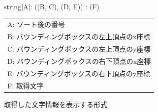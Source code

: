 \begin{figure}[tp]
    \begin{center}
        string[A]: ((B, C), (D, E)) : (F)
    \end{center}

    \begin{center}
        \begin{tabular}{l}
        A: ソート後の番号\\  
        B: バウンディングボックスの左上頂点のx座標\\
        C: バウンディングボックスの左上頂点のy座標\\  
        D: バウンディングボックスの右下頂点のx座標\\
        E: バウンディングボックスの右下頂点のy座標\\
        F: 取得文字\\
        \end{tabular}
    \end{center}
    \caption{取得した文字情報を表示する形式}
    \label{fig:format_char}
\end{figure}

